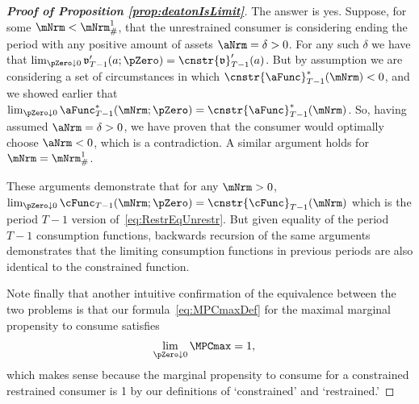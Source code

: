 \documentclass[\econtexRoot/BufferStockTheory]{subfiles}
\newcommand{\subname}{ApndxConcaveCFunc}
\begin{document}
\begin{proof}[\textbf{Proof of Proposition \ref{prop:deatonIsLimit}}]
The answer is yes.
Suppose, for some $\mNrm < \mNrm^{1}_{\#}$, that the unrestrained consumer is considering ending the period with any positive amount of assets $\aNrm=\delta > 0$.
For any such $\delta$ we have that $\lim_{\pZero \downarrow 0} \mathfrak{v}_{T-1}^{\prime}(a;\pZero)=\cnstr{\mathfrak{v}}_{T-1}^{\prime}(a)$.
But by assumption we are considering a set of circumstances in which $\cnstr{\aFunc}_{T-1}^{*}(\mNrm) < 0$, and we showed earlier that $\lim_{\pZero \downarrow 0} \aFunc_{T-1}^{*}(\mNrm;\pZero) = \cnstr{\aFunc}_{T-1}^{*}(\mNrm)$.
So, having assumed $\aNrm = \delta > 0$, we have proven that the consumer would optimally choose $\aNrm < 0$, which is a contradiction.
A similar argument holds for $\mNrm = \mNrm^{1}_{\#}$.

These arguments demonstrate that for any $\mNrm>0$, $\lim_{\pZero \downarrow 0} \cFunc_{T-1}(\mNrm;\pZero) = \cnstr{\cFunc}_{T-1}(\mNrm)$ which is the period $T-1$ version of~\eqref{eq:RestrEqUnrestr}.
But given equality of the period $T-1$ consumption functions, backwards recursion of the same arguments demonstrates that the limiting consumption functions in previous periods are also identical to the constrained function.

Note finally that another intuitive confirmation of the equivalence between the two problems is that our formula~\eqref{eq:MPCmaxDef} for the maximal marginal propensity to consume satisfies
\begin{eqnarray*}
  \lim_{\pZero \downarrow 0} \MPCmax  & = 1,
\end{eqnarray*}
which makes sense because the marginal propensity to consume for a constrained restrained consumer is 1 by our definitions of `constrained' and `restrained.'

\end{proof}

\end{document}
